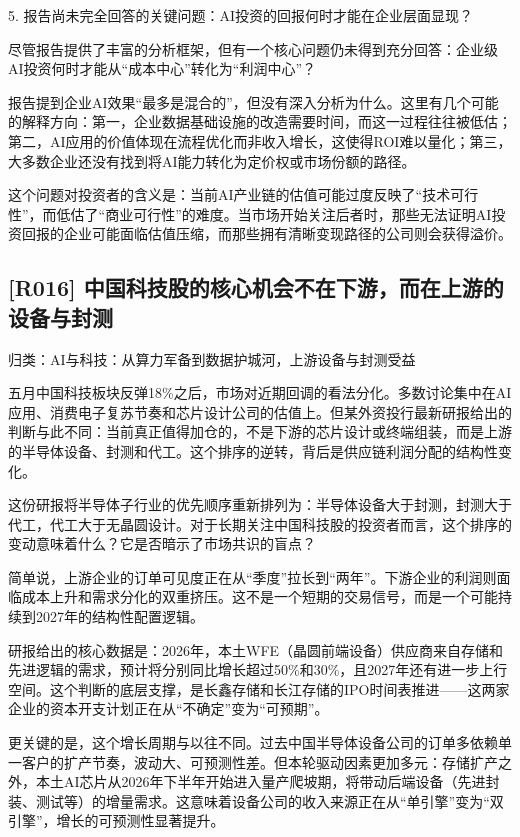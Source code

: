 \documentclass[11pt]{ctexart}
\begin{document}
5. 报告尚未完全回答的关键问题：AI投资的回报何时才能在企业层面显现？

尽管报告提供了丰富的分析框架，但有一个核心问题仍未得到充分回答：企业级AI投资何时才能从“成本中心”转化为“利润中心”？

报告提到企业AI效果“最多是混合的”，但没有深入分析为什么。这里有几个可能的解释方向：第一，企业数据基础设施的改造需要时间，而这一过程往往被低估；第二，AI应用的价值体现在流程优化而非收入增长，这使得ROI难以量化；第三，大多数企业还没有找到将AI能力转化为定价权或市场份额的路径。

这个问题对投资者的含义是：当前AI产业链的估值可能过度反映了“技术可行性”，而低估了“商业可行性”的难度。当市场开始关注后者时，那些无法证明AI投资回报的企业可能面临估值压缩，而那些拥有清晰变现路径的公司则会获得溢价。

\subsection{[R016] 中国科技股的核心机会不在下游，而在上游的设备与封测}
{\small\color{refgray}归类：AI与科技：从算力军备到数据护城河，上游设备与封测受益}

五月中国科技板块反弹18\%之后，市场对近期回调的看法分化。多数讨论集中在AI应用、消费电子复苏节奏和芯片设计公司的估值上。但某外资投行最新研报给出的判断与此不同：当前真正值得加仓的，不是下游的芯片设计或终端组装，而是上游的半导体设备、封测和代工。这个排序的逆转，背后是供应链利润分配的结构性变化。

这份研报将半导体子行业的优先顺序重新排列为：半导体设备大于封测，封测大于代工，代工大于无晶圆设计。对于长期关注中国科技股的投资者而言，这个排序的变动意味着什么？它是否暗示了市场共识的盲点？

简单说，上游企业的订单可见度正在从“季度”拉长到“两年”。下游企业的利润则面临成本上升和需求分化的双重挤压。这不是一个短期的交易信号，而是一个可能持续到2027年的结构性配置逻辑。

研报给出的核心数据是：2026年，本土WFE（晶圆前端设备）供应商来自存储和先进逻辑的需求，预计将分别同比增长超过50\%和30\%，且2027年还有进一步上行空间。这个判断的底层支撑，是长鑫存储和长江存储的IPO时间表推进——这两家企业的资本开支计划正在从“不确定”变为“可预期”。

更关键的是，这个增长周期与以往不同。过去中国半导体设备公司的订单多依赖单一客户的扩产节奏，波动大、可预测性差。但本轮驱动因素更加多元：存储扩产之外，本土AI芯片从2026年下半年开始进入量产爬坡期，将带动后端设备（先进封装、测试等）的增量需求。这意味着设备公司的收入来源正在从“单引擎”变为“双引擎”，增长的可预测性显著提升。
\end{document}
